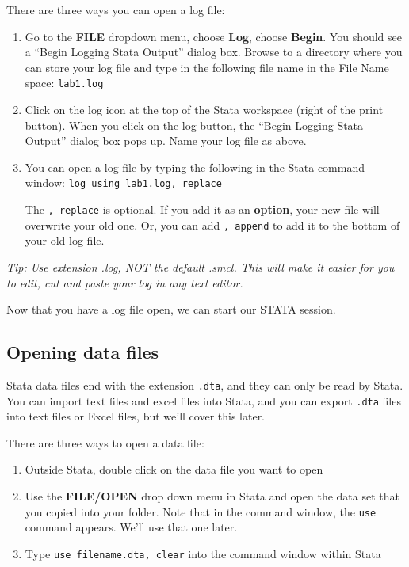\documentclass[11pt]{article}
\begin{document}
There are three ways you can open a log file:

\begin{enumerate}
\def\labelenumi{\arabic{enumi}.}
\item
  Go to the \textbf{FILE} dropdown menu, choose \textbf{Log}, choose
  \textbf{Begin}. You should see a ``Begin Logging Stata Output'' dialog
  box. Browse to a directory where you can store your log file and type
  in the following file name in the File Name space: \texttt{lab1.log}
\item
  Click on the log icon at the top of the Stata workspace (right of the
  print button). When you click on the log button, the ``Begin Logging
  Stata Output'' dialog box pops up. Name your log file as above.
\item
  You can open a log file by typing the following in the Stata command
  window: \texttt{log\ using\ lab1.log,\ replace}

  The \texttt{,\ replace} is optional. If you add it as an
  \textbf{option}, your new file will overwrite your old one. Or, you
  can add \texttt{,\ append} to add it to the bottom of your old log
  file.
\end{enumerate}

\emph{Tip: Use extension .log, NOT the default .smcl. This will make it
easier for you to edit, cut and paste your log in any text editor.}

Now that you have a log file open, we can start our STATA session.

\hypertarget{opening-data-files}{%
\subsection*{Opening data files}\label{opening-data-files}}

Stata data files end with the extension \texttt{.dta}, and they can only
be read by Stata. You can import text files and excel files into Stata,
and you can export \texttt{.dta} files into text files or Excel files,
but we'll cover this later.

There are three ways to open a data file:

\begin{enumerate}
\def\labelenumi{\arabic{enumi}.}
\item
  Outside Stata, double click on the data file you want to open
\item
  Use the \textbf{FILE/OPEN} drop down menu in Stata and open the data
  set that you copied into your folder. Note that in the command window,
  the \texttt{use} command appears. We'll use that one later.
\item
  Type \texttt{use\ filename.dta,\ clear} into the command window within
  Stata
\end{enumerate}
\end{document}
